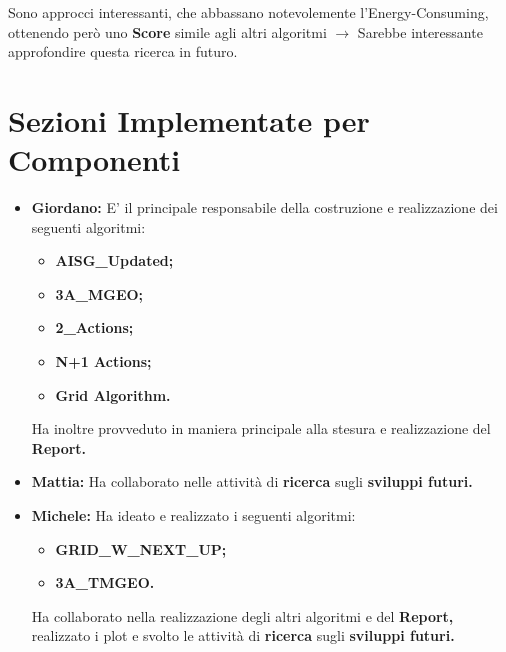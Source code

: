 \documentclass[12pt]{article}
\begin{document}
Sono approcci interessanti, che abbassano notevolemente l'Energy-Consuming, ottenendo però uno \textbf{Score} simile agli altri algoritmi $\rightarrow$ Sarebbe interessante approfondire questa ricerca in futuro.


\section{Sezioni Implementate per Componenti}

\begin{itemize}

    \item \textbf{Giordano:} E' il principale responsabile della costruzione e realizzazione dei seguenti algoritmi:
    
    \begin{itemize}
        
        \item \textbf{AISG\_Updated;}
        
        \item \textbf{3A\_MGEO;}
        
        \item \textbf{2\_Actions;}
        
        \item \textbf{N+1 Actions;}
        
        \item \textbf{Grid Algorithm.} 
        
    \end{itemize}
    
    Ha inoltre provveduto in maniera principale alla stesura e realizzazione del \textbf{Report.}
    
    \item \textbf{Mattia:} Ha collaborato nelle attività di \textbf{ricerca} sugli \textbf{sviluppi futuri.}
    
    \item \textbf{Michele:} Ha ideato e realizzato i seguenti algoritmi:
    \begin{itemize}
        
        \item \textbf{GRID\_W\_NEXT\_UP;}

        \item \textbf{3A\_TMGEO.}
    
    \end{itemize}
    Ha collaborato nella realizzazione degli altri algoritmi e del \textbf{Report,} realizzato i plot e svolto le attività di \textbf{ricerca} sugli \textbf{sviluppi futuri.}
    
    
\end{itemize}
\end{document}
